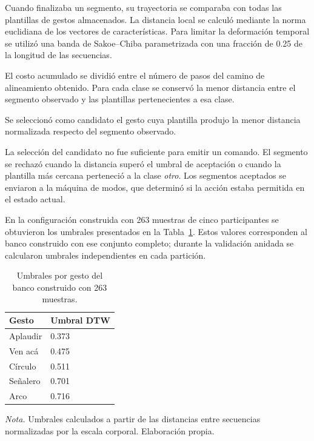Cuando finalizaba un segmento, su trayectoria se comparaba con todas las plantillas de gestos almacenados. La distancia local se calculó mediante la norma euclidiana de los vectores de características. Para limitar la deformación temporal se utilizó una banda de Sakoe–Chiba parametrizada con una fracción de 0.25 de la longitud de las secuencias.

El costo acumulado se dividió entre el número de pasos del camino de alineamiento obtenido. Para cada clase se conservó la menor distancia entre el segmento observado y las plantillas pertenecientes a esa clase.

Se seleccionó como candidato el gesto cuya plantilla produjo la menor distancia normalizada respecto del segmento observado.

La selección del candidato no fue suficiente para emitir un comando. El segmento se rechazó cuando la distancia superó el umbral de aceptación o cuando la plantilla más cercana perteneció a la clase \textit{otro}. Los segmentos aceptados se enviaron a la máquina de modos, que determinó si la acción estaba permitida en el estado actual.

En la configuración construida con 263 muestras de cinco participantes se obtuvieron los umbrales presentados en la Tabla~\ref{tab:drive_02}. Estos valores corresponden al banco construido con ese conjunto completo; durante la validación anidada se calcularon umbrales independientes en cada partición.

\begin{table}[htbp]
    \centering
    \caption{Umbrales por gesto del banco construido con 263 muestras.}
    \label{tab:drive_02}
    \begin{tabular}{|p{}|p{}|}
        \hline
        Gesto & Umbral DTW \\
        \hline
        Aplaudir & 0.373 \\
        Ven acá & 0.475 \\
        Círculo & 0.511 \\
        Señalero & 0.701 \\
        Arco & 0.716 \\
        \hline
    \end{tabular}

    \begin{minipage}{0.92\textwidth}
        \footnotesize
        \textit{Nota.} Umbrales calculados a partir de las distancias entre secuencias normalizadas por la escala corporal. Elaboración propia.
    \end{minipage}
\end{table}

